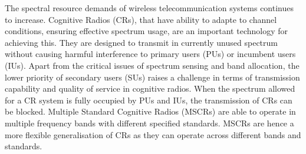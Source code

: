 The spectral resource demands of wireless telecommunication systems continues to increase. %
Cognitive Radios (CRs), that have ability to adapte to channel conditions, ensuring effective spectrum usage, are an important technology for achieving this. 
They are designed to transmit in currently unused spectrum without causing harmful interference to primary users (PUs) or incumbent users (IUs).
Apart from the critical issues of spectrum sensing and band allocation, the lower priority of secondary users (SUs) raises a challenge in terms of transmission capability and quality of service in cognitive radios. 
When the spectrum allowed for a CR system is fully occupied by PUs and IUs, the transmission of CRs can be blocked. 
Multiple Standard Cognitive Radios (MSCRs) are able to operate in multiple frequency bands with different specified standards.
MSCRs are hence a more flexible generalisation of CRs as they can operate across different bands and standards.


